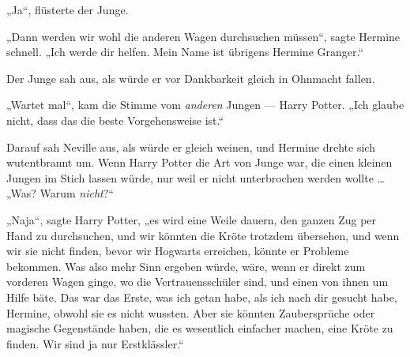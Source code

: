 „Ja“, flüsterte der Junge.

„Dann werden wir wohl die anderen Wagen durchsuchen müssen“, sagte Hermine schnell.
„Ich werde dir helfen. Mein Name ist übrigens Hermine Granger.“

Der Junge sah aus, als würde er vor Dankbarkeit gleich in Ohnmacht fallen.

„Wartet mal“, kam die Stimme vom \emph{anderen} Jungen — Harry Potter.
„Ich glaube nicht, dass das die beste Vorgehensweise ist.“

Darauf sah Neville aus, als würde er gleich weinen, und Hermine drehte sich wutentbrannt um. Wenn Harry Potter die Art von Junge war, die einen kleinen Jungen im Stich lassen würde, nur weil er nicht unterbrochen werden wollte …
„Was? Warum \emph{nicht}?“

„Naja“, sagte Harry Potter, „es wird eine Weile dauern, den ganzen Zug per Hand zu durchsuchen, und wir könnten die Kröte trotzdem übersehen, und wenn wir sie nicht finden, bevor wir Hogwarts erreichen, könnte er Probleme bekommen. Was also mehr Sinn ergeben würde, wäre, wenn er direkt zum vorderen Wagen ginge, wo die Vertrauensschüler sind, und einen von ihnen um Hilfe bäte. Das war das Erste, was ich getan habe, als ich nach dir gesucht habe, Hermine, obwohl sie es nicht wussten. Aber sie könnten Zaubersprüche oder magische Gegenstände haben, die es wesentlich einfacher machen, eine Kröte zu finden. Wir sind ja nur Erstklässler.“

